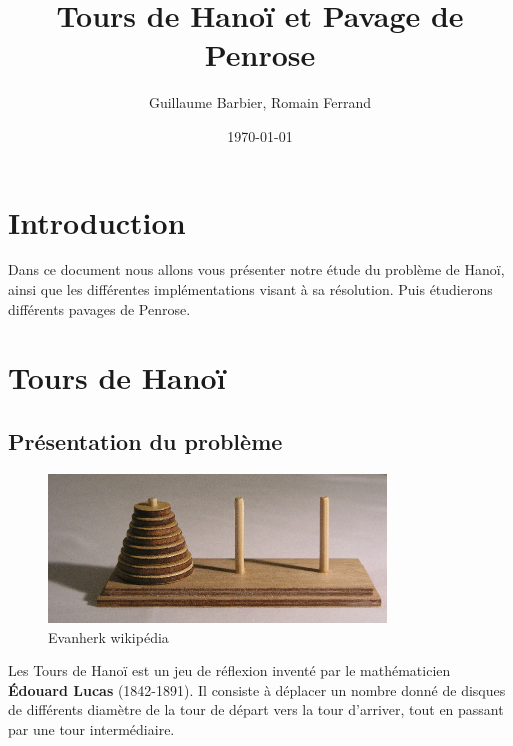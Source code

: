 \documentclass[a4paper,11pt]{article}
\begin{document}
\begin{titlepage}
  \title{Tours de Hanoï et Pavage de Penrose}
  \author{Guillaume Barbier, Romain Ferrand}
  \date{\today}

  \maketitle

  \begin{abstract}
    
  \end{abstract}
\end{titlepage}

\section*{Introduction}
\begin{center}
	Dans ce document nous allons vous présenter notre étude du problème de Hanoï,
    ainsi que les différentes implémentations visant à sa résolution.
    Puis étudierons différents pavages de Penrose.
\end{center}

\section{Tours de Hanoï}
\label{chap:hanoi}

\subsection{Présentation du problème}
\label{sec:prezHanoi}
\begin{figure}
  \centering
  \includegraphics[width=0.8\textwidth]{Tower_of_Hanoi.jpeg}
  \caption{Evanherk wikipédia}
  \label{fig:phd}
\end{figure}

Les Tours de Hanoï est un jeu de réflexion inventé par le mathématicien \textbf{Édouard Lucas} (1842-1891).
Il consiste à déplacer un nombre donné de disques de différents diamètre de la tour de départ vers la tour d'arriver,
tout en passant par une tour intermédiaire.
\end{document}
